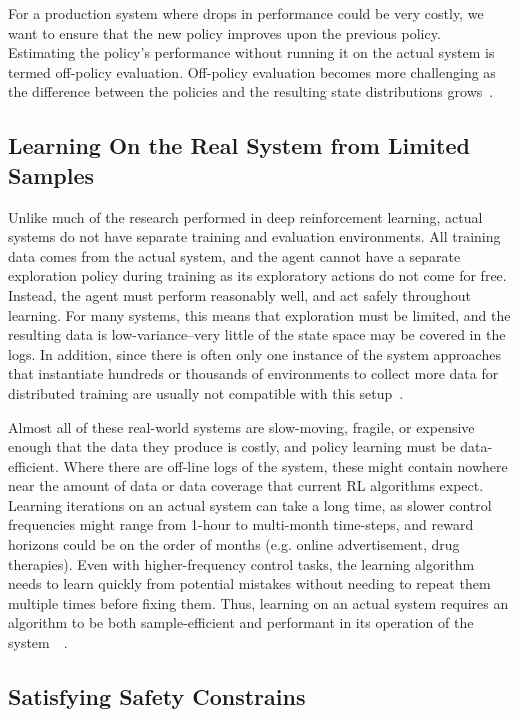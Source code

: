 \documentclass[letterpaper, 10 pt]{IEEEconf}
\begin{document}
For a production system where drops in performance could be very
costly, we want to ensure that the new policy improves upon the
previous policy. Estimating the policy’s performance without running
it on the actual system is termed off-policy evaluation. Off-policy
evaluation becomes more challenging as the difference between the
policies and the resulting state distributions grows~\cite{deepmind2019}.

\subsection{Learning On the Real System from Limited Samples}

Unlike much of the research performed in deep reinforcement learning,
actual systems do not have separate training and evaluation
environments. All training data comes from the actual system, and the
agent cannot have a separate exploration policy during training as its
exploratory actions do not come for free. Instead, the agent must
perform reasonably well, and act safely throughout learning. For many
systems, this means that exploration must be limited, and the
resulting data is low-variance–very little of the state space may be
covered in the logs. In addition, since there is often only one
instance of the system approaches that instantiate hundreds or
thousands of environments to collect more data for distributed
training are usually not compatible with this setup~\cite{deepmind2019}.

Almost all of these real-world systems are slow-moving, fragile, or
expensive enough that the data they produce is costly, and policy
learning must be data-efficient. Where there are off-line logs of the
system, these might contain nowhere near the amount of data or data
coverage that current RL algorithms expect. Learning iterations on an
actual system can take a long time, as slower control frequencies
might range from 1-hour to multi-month time-steps, and reward horizons
could be on the order of months (e.g. online advertisement, drug
therapies). Even with higher-frequency control tasks, the learning
algorithm needs to learn quickly from potential mistakes without
needing to repeat them multiple times before fixing them. Thus,
learning on an actual system requires an algorithm to be both
sample-efficient and performant in its operation of the system~\cite{deepmind2019}~\cite{microsoft_research_2018}.

\subsection{Satisfying Safety Constrains}
\end{document}
